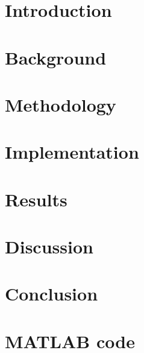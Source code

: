 \documentclass[12pt,a4paper]{report}
\begin{document}
\chapter{Introduction}\label{ch:intro}


\chapter{Background}\label{ch:background}


\chapter{Methodology}\label{ch:method}


\chapter{Implementation}\label{ch:impl}


\chapter{Results}\label{ch:results}


\chapter{Discussion}\label{ch:discussion}


\chapter{Conclusion}\label{ch:conclusion}


\clearpage
{}
{}



\appendix
\chapter{MATLAB code}\label{app:code}

\end{document}
